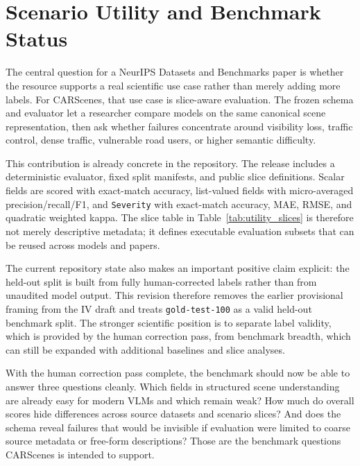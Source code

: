 \section{Scenario Utility and Benchmark Status}
\label{sec:baseline}

The central question for a NeurIPS Datasets and Benchmarks paper is whether the resource supports a real scientific use case rather than merely adding more labels. For CARScenes, that use case is slice-aware evaluation. The frozen schema and evaluator let a researcher compare models on the same canonical scene representation, then ask whether failures concentrate around visibility loss, traffic control, dense traffic, vulnerable road users, or higher semantic difficulty.

This contribution is already concrete in the repository. The release includes a deterministic evaluator, fixed split manifests, and public slice definitions. Scalar fields are scored with exact-match accuracy, list-valued fields with micro-averaged precision/recall/F1, and \texttt{Severity} with exact-match accuracy, MAE, RMSE, and quadratic weighted kappa. The slice table in Table~\ref{tab:utility_slices} is therefore not merely descriptive metadata; it defines executable evaluation subsets that can be reused across models and papers.

The current repository state also makes an important positive claim explicit: the held-out split is built from fully human-corrected labels rather than from unaudited model output. This revision therefore removes the earlier provisional framing from the IV draft and treats \texttt{gold-test-100} as a valid held-out benchmark split. The stronger scientific position is to separate label validity, which is provided by the human correction pass, from benchmark breadth, which can still be expanded with additional baselines and slice analyses.

With the human correction pass complete, the benchmark should now be able to answer three questions cleanly. Which fields in structured scene understanding are already easy for modern VLMs and which remain weak? How much do overall scores hide differences across source datasets and scenario slices? And does the schema reveal failures that would be invisible if evaluation were limited to coarse source metadata or free-form descriptions? Those are the benchmark questions CARScenes is intended to support.
